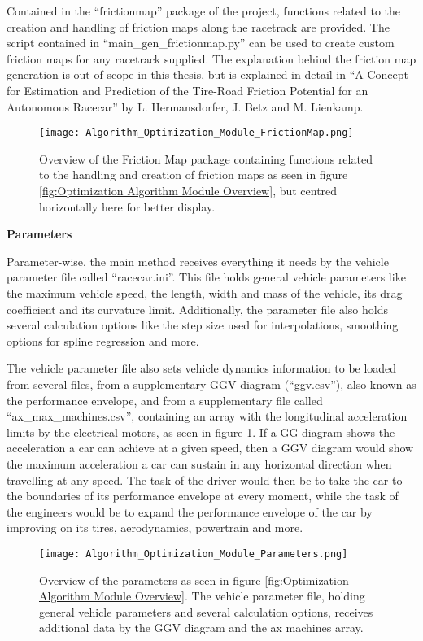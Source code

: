 Contained in the ``frictionmap'' package of the project, functions related to the creation and handling of friction maps along the racetrack are provided.
The script contained in ``main\_gen\_frictionmap.py'' can be used to create custom friction maps for any racetrack supplied. The explanation behind the friction map generation is out of scope in this thesis, but is explained in detail in ``A Concept for Estimation and Prediction of the Tire-Road Friction Potential for an Autonomous Racecar'' by L. Hermansdorfer, J. Betz and M. Lienkamp. \cite{friction_map_generation}
\begin{figure}[H]
    \centering
    \texttt{[image: Algorithm\_Optimization\_Module\_FrictionMap.png]}
    \caption{Overview of the Friction Map package containing functions related to the handling and creation of friction maps as seen in figure \ref{fig:Optimization Algorithm Module Overview}, but centred horizontally here for better display.}
\end{figure}

\textbf{Parameters}

Parameter-wise, the main method receives everything it needs by the vehicle parameter file called ``racecar.ini''. This file holds general vehicle parameters like the maximum vehicle speed, the length, width and mass of the vehicle, its drag coefficient and its curvature limit. Additionally, the parameter file also holds several calculation options like the step size used for interpolations, smoothing options for spline regression and more.

The vehicle parameter file also sets vehicle dynamics information to be loaded from several files, from a supplementary GGV diagram (``ggv.csv''), also known as the performance envelope, and from a supplementary file called ``ax\_max\_machines.csv'', containing an array with the longitudinal acceleration limits by the electrical motors, as seen in figure \ref{fig:Optimization Algorithm Module Parameters}. If a GG diagram shows the acceleration a car can achieve at a given speed, then a GGV diagram would show the maximum acceleration a car can sustain in any horizontal direction when travelling at any speed. The task of the driver would then be to take the car to the boundaries of its performance envelope at every moment, while the task of the engineers would be to expand the performance envelope of the car by improving on its tires, aerodynamics, powertrain and more. \cite{the_performance_envelope_or_ggv_diagram}
\begin{figure}[H]
    \centering
    \texttt{[image: Algorithm\_Optimization\_Module\_Parameters.png]}
    \caption{Overview of the parameters as seen in figure \ref{fig:Optimization Algorithm Module Overview}. The vehicle parameter file, holding general vehicle parameters and several calculation options, receives additional data by the GGV diagram and the ax machines array.}
    \label{fig:Optimization Algorithm Module Parameters}
\end{figure}

